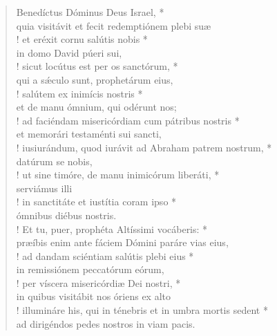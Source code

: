 \begin{verse}
 


Benedíctus Dóminus Deus Israel, *\\
quia visitávit et fecit redemptiónem plebi suæ\\!
\vin et eréxit cornu salútis nobis *\\
\vin in domo David púeri sui,\\!
sicut locútus est per os sanctórum, *\\
qui a sǽculo sunt, prophetárum eius,\\!
\vin salútem ex inimícis nostris *\\
\vin et de manu ómnium, qui odérunt nos;\\!
ad faciéndam misericórdiam cum pátribus nostris *\\
et memorári testaménti sui sancti,\\!
\vin iusiurándum, quod iurávit 
	ad Abraham patrem nostrum, *\\
\vin datúrum se nobis,\\!
ut sine timóre, de manu inimicórum liberáti, *\\
serviámus illi\\!
\vin in sanctitáte et iustítia coram ipso *\\
\vin ómnibus diébus nostris.\\!
Et tu, puer, prophéta Altíssimi vocáberis: *\\
præíbis enim ante fáciem Dómini 
	paráre vias eius,\\!
\vin ad dandam sciéntiam salútis plebi eius *\\
\vin in remissiónem peccatórum eórum,\\!
per víscera misericórdiæ Dei nostri, *\\
in quibus visitábit nos óriens ex alto\\!
\vin illumináre his, qui in ténebris et in umbra mortis sedent *\\
\vin ad dirigéndos pedes nostros in viam pacis.\\

\end{verse}







